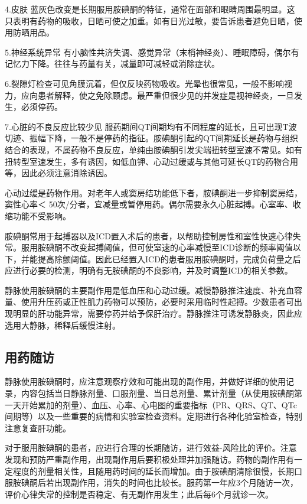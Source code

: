 4.皮肤
蓝灰色改变是长期服用胺碘酮的特征，通常在面部和眼睛周围最明显。这只表明有药物的吸收，日晒可使之加重。如有日光过敏，要告诉患者避免日晒，使用防晒用品。

5.神经系统异常
有小脑性共济失调、感觉异常（末梢神经炎）、睡眠障碍，偶尔有记忆力下降。往往与药量有关，减量即可减轻或消除症状。

6.裂隙灯检查可见角膜沉着，但仅反映药物吸收。光晕也很常见，一般不影响视力，应向患者解释，使之免除顾虑。最严重但很少见的并发症是视神经炎，一旦发生，必须停药。

7.心脏的不良反应比较少见
服药期间QT间期均有不同程度的延长，且可出现T波切迹、振幅下降，一般不是停药的指征。胺碘酮引起的QT间期延长是药物与组织结合的表现，不属药物不良反应，单纯由胺碘酮引发尖端扭转型室速不常见。如有扭转型室速发生，多有诱因，如低血钾、心动过缓或与其他可延长QT的药物合用等，因此必须注意消除诱因。

心动过缓是药物作用。对老年人或窦房结功能低下者，胺碘酮进一步抑制窦房结，窦性心率＜
50次/分者，宜减量或暂停用药。偶尔需要永久心脏起搏。心室率、收缩功能不受影响。

胺碘酮常用于起搏器以及ICD置入术后的患者，以帮助控制房性和室性快速心律失常。服用胺碘酮不改变起搏阈值，但可使室速的心率减慢至ICD诊断的频率阈值以下，并能提高除颤阈值。因此已经置入ICD的患者服用胺碘酮时，完成负荷量之后应进行必要的检测，明确有无胺碘酮的不良影响，并及时调整ICD的相关参数。

静脉使用胺碘酮的主要副作用是低血压和心动过缓。减慢静脉推注速度、补充血容量、使用升压药或正性肌力药物可以预防，必要时采用临时性起搏。少数患者可出现明显的肝功能异常，需要停药并给予保肝治疗。静脉推注可诱发静脉炎，因此应选用大静脉，稀释后缓慢注射。

\subsection{用药随访}

静脉使用胺碘酮时，应注意观察疗效和可能出现的副作用，并做好详细的使用记录，内容包括当日静脉剂量、口服剂量、当日总剂量、累计剂量（从使用胺碘酮第一天开始累加的剂量）、血压、心率、心电图的重要指标（PR、QRS、QT、QTc间期等）以及一些重要的病情和实验室检查资料。定期进行各种化验室检查，特别注意复查肝功能。

对于服用胺碘酮的患者，应进行合理的长期随访，进行效益-风险比的评价。注意发现和预防严重副作用，出现副作用后要积极处理并加强随访。药物的副作用有一定程度的剂量相关性，且随用药时间的延长而增加。由于胺碘酮清除很慢，长期口服胺碘酮后若出现副作用，消失的时间也比较长。服药第一年应3个月随访一次，评价心律失常的控制是否稳定、有无副作用发生；此后每6个月就诊一次。

